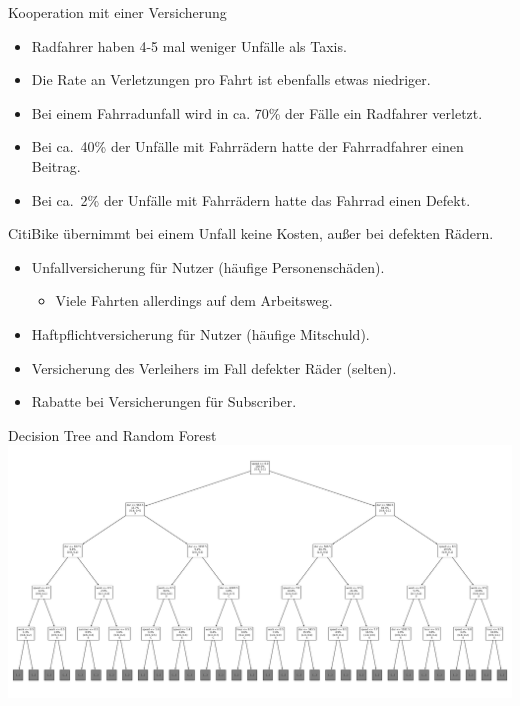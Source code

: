 \begin{frame}{Kooperation mit einer Versicherung}
{
\begin{itemize}
\item Radfahrer haben 4-5 mal weniger Unfälle als Taxis.
\item Die Rate an Verletzungen pro Fahrt ist ebenfalls etwas niedriger.
\item Bei einem Fahrradunfall wird in ca. 70\% der Fälle ein Radfahrer verletzt.
\item Bei ca.\ 40\% der Unfälle mit Fahrrädern hatte der Fahrradfahrer einen Beitrag.
\item Bei ca.\ 2\% der Unfälle mit Fahrrädern hatte das Fahrrad einen Defekt.
\end{itemize}
}
{
CitiBike übernimmt bei einem Unfall keine Kosten, außer bei defekten Rädern.
\begin{itemize}
\item Unfallversicherung für Nutzer (häufige Personenschäden).
\begin{itemize}
\item Viele Fahrten allerdings auf dem Arbeitsweg.
\end{itemize}
\item Haftpflichtversicherung für Nutzer (häufige Mitschuld).
\item Versicherung des Verleihers im Fall defekter Räder (selten).
\item Rabatte bei Versicherungen für Subscriber.
\end{itemize}
}
\end{frame}

\begin{frame}{Decision Tree and Random Forest}
\includegraphics[width=\textwidth]{../Images/ExampleTree}
\end{frame}






